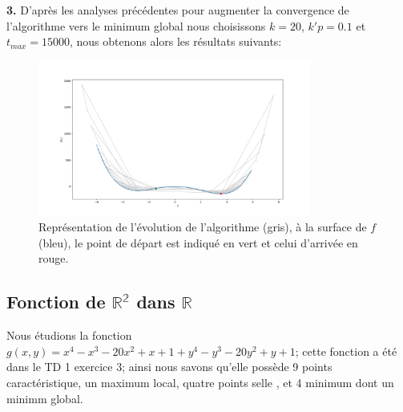\documentclass[12pt]{article}
\begin{document}
\textbf{\color{brick}3.} D'après les analyses précédentes pour augmenter la convergence de l'algorithme vers le minimum global nous choisissons $k=20$, $k'p=0.1$ et $t_{max}=15000$, nous obtenons alors les résultats suivants:
\begin{figure}[H]
\centering
\includegraphics[width=0.8\textwidth]{Q132.png}
\caption{Représentation de l'évolution de l'algorithme (gris), à la surface de $f$ (bleu), le point de départ est indiqué en vert et celui d'arrivée en rouge.}
\label{Q1_T}
\end{figure}

\begin{center}
\end{center}
\newpage
\subsection{Fonction de $\mathbb{R^2}$ dans $\mathbb{R}$}
Nous étudions la fonction $g(x,y)= x^4-x^3-20x^2+x+1 +y^4-y^3-20y^2+y+1$; cette fonction a été dans le TD 1 exercice 3; ainsi nous savons qu'elle possède 9 points caractéristique, un maximum local, quatre points selle , et 4 minimum dont un minimm global.

   
\end{document}
